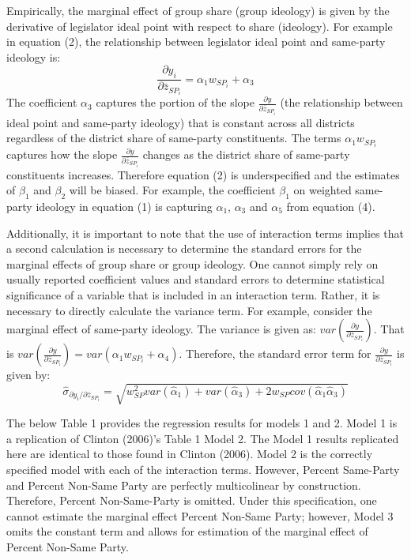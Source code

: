 \documentclass[10pt,letterpaper]{article}
\begin{document}
Empirically, the marginal effect of group share (group ideology) is given by the derivative of legislator ideal point with respect to share (ideology). For example in equation (2), the relationship between legislator ideal point and same-party ideology is: 
$$\frac{\partial y_i}{\partial \bar{z}_{SP_i}}= \alpha_1 w_{SP_i} + \alpha_3$$
The coefficient $\alpha_3$ captures the portion of the slope $\frac{\partial y}{\partial \bar{z}_{SP_i}}$ (the relationship between ideal point and same-party ideology) that is constant across all districts regardless of the district share of same-party constituents. The terms $\alpha_1 w_{SP_i}$ captures how the slope $\frac{\partial y}{\partial \bar{z}_{SP_i}}$ changes as the district share of same-party constituents increases. Therefore equation (2) is underspecified and the estimates of $\beta_1$ and $\beta_2$ will be biased. For example, the coefficient $\beta_1$ on weighted same-party ideology in equation (1) is capturing $\alpha_1$, $\alpha_3$ and $\alpha_5$ from equation (4).

Additionally, it is important to note that the use of interaction terms implies that a second calculation is necessary to determine the standard errors for the marginal effects of group share or group ideology. One cannot simply rely on usually reported coefficient values and standard errors to determine statistical significance of a variable that is included in an interaction term. Rather, it is necessary to directly calculate the variance term. For example, consider the marginal effect of same-party ideology. The variance is given as:  $var(\frac{\partial y}{\partial \bar{z}_{SP_i}})$. That is $var(\frac{\partial y}{\partial \bar{z}_{SP_i}}) = var(\alpha_1 w_{SP_i} + \alpha_4)$. Therefore, the standard error term for $\frac{\partial y}{\partial \bar{z}_{SP_i}}$ is given by:
$$\hat{\sigma}_{\partial y_i / \partial \bar{z}_{SP_i}} = \sqrt{w_{SP}^2var(\hat{\alpha}_1)+var(\hat{\alpha}_3)+2w_{SP}cov(\hat{\alpha}_1\hat{\alpha}_3)}$$

The below Table 1 provides the regression results for models 1 and 2. Model 1 is a replication of Clinton (2006)'s Table 1 Model 2. The Model 1 results replicated here are identical to those found in Clinton (2006). Model 2 is the correctly specified model with each of the interaction terms. However, Percent Same-Party and Percent Non-Same Party are perfectly multicolinear by construction. Therefore, Percent Non-Same-Party is omitted. Under this specification, one cannot estimate the marginal effect Percent Non-Same Party; however, Model 3 omits the constant term and allows for estimation of the marginal effect of Percent Non-Same Party.
\end{document}
